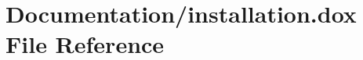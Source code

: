\hypertarget{installation_8dox}{}\section{Documentation/installation.dox File Reference}
\label{installation_8dox}
